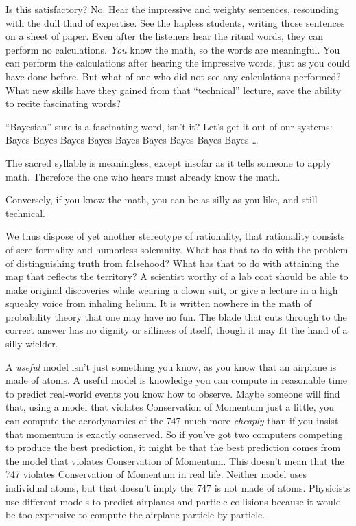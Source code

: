 {
 Is this satisfactory? No. Hear the impressive and weighty
sentences, resounding with the dull thud of expertise. See the hapless
students, writing those sentences on a sheet of paper. Even after the
listeners hear the ritual words, they can perform no calculations.
\textit{You} know the math, so the words are meaningful. You can
perform the calculations after hearing the impressive words, just as
you could have done before. But what of one who did not see any
calculations performed? What new skills have they gained from that
``technical'' lecture, save the
ability to recite fascinating words?}

{
 ``Bayesian'' sure is a
fascinating word, isn't it? Let's get
it out of our systems: Bayes Bayes Bayes Bayes Bayes Bayes Bayes Bayes
Bayes \ldots}

{
 The sacred syllable is meaningless, except insofar as it tells
someone to apply math. Therefore the one who hears must already know
the math.}

{
 Conversely, if you know the math, you can be as silly as you like,
and still technical.}

{
 We thus dispose of yet another stereotype of rationality, that
rationality consists of sere formality and humorless solemnity. What
has that to do with the problem of distinguishing truth from falsehood?
What has that to do with attaining the map that reflects the territory?
A scientist worthy of a lab coat should be able to make original
discoveries while wearing a clown suit, or give a lecture in a high
squeaky voice from inhaling helium. It is written nowhere in the math
of probability theory that one may have no fun. The blade that cuts
through to the correct answer has no dignity or silliness of itself,
though it may fit the hand of a silly wielder.}

\hr

{
 A \textit{useful} model isn't just something you
know, as you know that an airplane is made of atoms. A useful model is
knowledge you can compute in reasonable time to predict real-world
events you know how to observe. Maybe someone will find that, using a
model that violates Conservation of Momentum just a little, you can
compute the aerodynamics of the 747 much more \textit{cheaply} than if
you insist that momentum is exactly conserved. So if
you've got two computers competing to produce the best
prediction, it might be that the best prediction comes from the model
that violates Conservation of Momentum. This doesn't
mean that the 747 violates Conservation of Momentum in real life.
Neither model uses individual atoms, but that doesn't
imply the 747 is not made of atoms. Physicists use different models to
predict airplanes and particle collisions because it would be too
expensive to compute the airplane particle by particle.}

